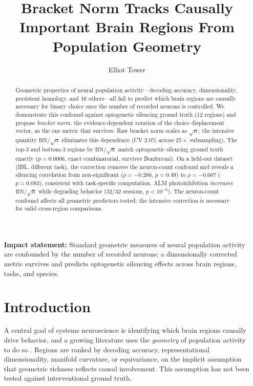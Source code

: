 \documentclass[9pt,lineno]{elife}
\title{Bracket Norm Tracks Causally Important Brain Regions From Population Geometry}
\author[1]{Elliot Tower}
\affil[1]{Independent Researcher}
\begin{document}
\maketitle

\begin{abstract}
Geometric properties of neural population activity---decoding accuracy, dimensionality, persistent homology, and 16 others---all fail to predict which brain regions are causally necessary for binary choice once the number of recorded neurons is controlled. We demonstrate this confound against optogenetic silencing ground truth (12 regions) and propose \emph{bracket norm}, the evidence-dependent rotation of the choice displacement vector, as the one metric that survives. Raw bracket norm scales as $\sqrt{n}$; the intensive quantity $\text{BN}/\!\sqrt{n}$ eliminates this dependence (CV $2.0\%$ across $25\times$ subsampling). The top-3 and bottom-3 regions by $\text{BN}/\!\sqrt{n}$ match optogenetic silencing ground truth exactly ($p = 0.0006$, exact combinatorial, survives Bonferroni). On a held-out dataset (IBL, different task), the correction removes the neuron-count confound and reveals a silencing correlation from non-significant ($\rho = -0.286$, $p = 0.49$) to $\rho = -0.667$ ($p = 0.083$), consistent with task-specific computation. ALM photoinhibition \emph{increases} $\text{BN}/\!\sqrt{n}$ while degrading behavior (32/32 sessions, $p < 10^{-6}$). The neuron-count confound affects all geometric predictors tested; the intensive correction is necessary for valid cross-region comparisons.
\end{abstract}

\noindent\textbf{Impact statement:} Standard geometric measures of neural population activity are confounded by the number of recorded neurons; a dimensionally corrected metric survives and predicts optogenetic silencing effects across brain regions, tasks, and species.

\section{Introduction}

A central goal of systems neuroscience is identifying which brain regions causally drive behavior, and a growing literature uses the \emph{geometry} of population activity to do so \citep{cunningham2014dimensionality, gallego2017neural}. Regions are ranked by decoding accuracy, representational dimensionality, manifold curvature, or equivariance, on the implicit assumption that geometric richness reflects causal involvement. This assumption has not been tested against interventional ground truth.
\end{document}
